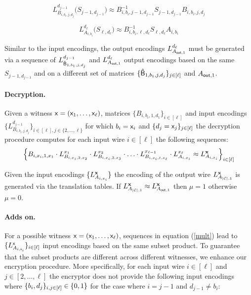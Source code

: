 \begin{equation*}
L_{B_{i,b_i,j,d_j}}^{d_{j-1}}\big(S_{j-1,d_{j-1}}\big)\approx  B_{i,b_i,j-1,d_{j-1}}^{-1}S_{j-1,d_{j-1}}B_{i,b_i,j,d_{j}} 
         \end{equation*}

\begin{equation*}
L_{A_{i,b_i}}^{d_{\ell}}\big(S_{\ell,d_{\ell}}\big)\approx B_{i,b_i,\ell,d_{\ell}}^{-1}S_{\ell,d_{\ell}}A_{i,b_i}  \end{equation*}


Similar to the input encodings, the output encodings $L_{A_{\mathsf{out},1}}^{d_{\ell}}$ must be generated via a sequence of $L_{\mathsf{\hat{B}}_{1,b_1,j,d_j}}^{d_{j-1}}$ and $L_{A_{\mathsf{out},1}}^{d_{\ell}}$ output encodings based on the same $S_{j-1,d_{j-1}}$ and on a different set of matrices $\{\mathsf{\hat{B}}_{1,b_1,j,d_j}\}_{j\in[\ell]}$ and $A_{\mathsf{out},1}$. 

\paragraph{Decryption.} Given a witness $\mathsf{x}=(\mathsf{x}_1,\ldots,\mathsf{x}_\ell)$, matrices $\{B_{i,b_i,1,d_1}\}_{i\in[\ell]}$ and input encodings $\{L_{B_{i,b_i,j,d_j}}^{d_{j-1}}\}_{i\in[\ell],j\in\{2,\ldots,\ell\}}$ for which $b_i=\mathsf{x}_i$ and $\{d_j=\mathsf{x}_j\}_{j\in[\ell]}$ the decryption procedure computes for each input wire $i\in[\ell]$ the following sequences:  
\begin{equation}\label{mult}
\Big\{B_{i,x_i,1,x_1}\cdot L_{B_{i,x_i,2,x_2}}^{x_{1}}\cdot L_{B_{i,x_i,3,x_3}}^{x_{2}}\cdot\ldots\cdot L_{B_{i,x_i,\ell,x_\ell}}^{x_{\ell-1}}\cdot L_{A_{i,x_i}}^{x_{\ell}}\approx L_{A_{i,x_i}}^{\mathsf{{\bf x}}}\Big\}_{i\in[\ell]}
   \end{equation}


Given the input encodings $\{L_{A_{i,x_i}}^{\mathsf{{\bf x}}}\}$ the encoding of the output wire $L_{A_{|{\cal C}|,1}}^{\mathsf{{\bf x}}}$ is generated via the translation tables. If $L_{A_{|{\cal C}|,1}}^{\mathsf{{\bf x}}}\approx L_{A_{\mathsf{out},1}}^{\mathsf{{\bf x}}}$ then $\mu=1$ otherwise $\mu=0$. 







\paragraph{Adds on.}
For a possible witness $\mathsf{x}=(\mathsf{x}_1,\ldots,\mathsf{x}_\ell)$, sequences in equation (\ref{mult}) lead to $\{L^{\mathsf{x}}_{A_{i,\mathsf{x}_i}}\}_{i\in[\ell]}$ input encodings based on the same subset product. To guarantee that the subset products are different across different witnesses, we enhance our encryption procedure. More specifically, for each input wire $i\in[\ell]$ and $j\in[2,\ldots,\ell]$ the encryptor does not provide the following input encodings where $\{b_i,d_j\}_{i,j\in[\ell]}\in\{0,1\}$ for the case where $i=j-1$ and $d_{j-1}\neq b_{i}$:

